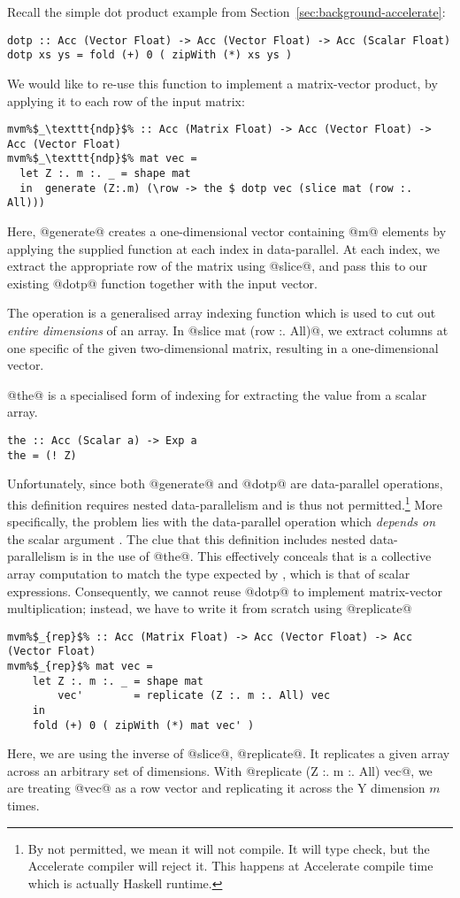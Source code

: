 Recall the simple dot product example from Section~\ref{sec:background-accelerate}:
%
\begin{lstlisting}
dotp :: Acc (Vector Float) -> Acc (Vector Float) -> Acc (Scalar Float)
dotp xs ys = fold (+) 0 ( zipWith (*) xs ys )
\end{lstlisting}
%
We would like to re-use this function to implement a matrix-vector product, by applying it to each row of the input matrix:
%
\begin{lstlisting}
mvm%$_\texttt{ndp}$% :: Acc (Matrix Float) -> Acc (Vector Float) -> Acc (Vector Float)
mvm%$_\texttt{ndp}$% mat vec =
  let Z :. m :. _ = shape mat
  in  generate (Z:.m) (\row -> the $ dotp vec (slice mat (row :. All)))
\end{lstlisting}
%
Here, @generate@ creates a one-dimensional vector containing @m@ elements by applying the supplied function at each index in data-parallel. At each index, we
extract the appropriate row of the matrix using @slice@, and pass this to our existing @dotp@ function together with the input vector.

The  operation is a generalised array indexing function which is used to cut out \emph{entire dimensions} of an array. In @slice mat (row :. All)@,
we extract  columns at one specific  of the given
two-dimensional matrix, resulting in a one-dimensional vector.

@the@ is a specialised form of indexing for extracting the value from a scalar array.
%
\begin{lstlisting}
the :: Acc (Scalar a) -> Exp a
the = (! Z)
\end{lstlisting}
%

Unfortunately, since both @generate@ and @dotp@ are data-parallel operations,
this definition requires nested data-parallelism and is thus not permitted.\footnote{By not permitted, we mean it will not compile. It will type check, but the Accelerate compiler will reject it. This happens at Accelerate compile time which is actually Haskell runtime.}
%
More specifically, the problem lies with the data-parallel operation
 which \emph{depends on} the scalar argument . The clue that
this definition includes nested data-parallelism is in the use of @the@.
This effectively conceals that  is a collective array computation to match the type expected by , which is that of scalar expressions.
Consequently, we cannot reuse @dotp@ to implement matrix-vector multiplication; instead, we have to write it from scratch using @replicate@
%
\begin{lstlisting}
mvm%$_{rep}$% :: Acc (Matrix Float) -> Acc (Vector Float) -> Acc (Vector Float)
mvm%$_{rep}$% mat vec =
    let Z :. m :. _ = shape mat
        vec'        = replicate (Z :. m :. All) vec
    in
    fold (+) 0 ( zipWith (*) mat vec' )
\end{lstlisting}
%
Here, we are using the inverse of @slice@, @replicate@. It replicates a given array across an arbitrary set of dimensions. With @replicate (Z :. m :. All) vec@, we are treating @vec@ as a row vector and replicating it across the Y dimension $m$ times.

